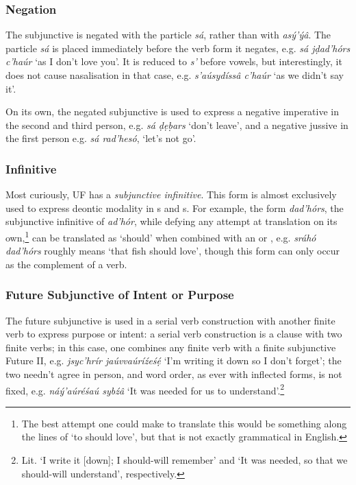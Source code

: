 \documentclass[a4paper, 12pt, twoside, final]{article}
\let \w \textit
\begin{document}
\subsubsection{Negation}\label{subsubsec:negated-subjunctive}
The subjunctive is negated with the particle \w{sá}, rather than with \w{asý’ýâ}. The particle \w{sá} is placed
immediately before the verb form it negates, e.g. \w{sá jḍad’hórs c’haúr} ‘as I don’t love you’. It is reduced
to \w{s’} before vowels, but interestingly, it does not cause nasalisation in that case, e.g. \w{s’aúsydíssâ c’haúr}
‘as we didn’t say it’.

On its own, the negated subjunctive is used to express a negative imperative in the second and third person,
e.g. \w{sá ḍẹḅars} ‘don’t leave’, and a negative jussive in the first person e.g. \w{sá rad’hesó}, ‘let’s not go’.

\subsubsection{Infinitive}
Most curiously, UF has a \textit{subjunctive infinitive}. This form is almost exclusively used to express deontic modality
in s and s. For example, the form \w{dad’hórs}, the subjunctive infinitive of \w{ad’hór}, while defying any attempt
at translation on its own,\footnote{The best attempt one could make to translate this would be something along the
lines of ‘to should love’, but that is not exactly grammatical in English.} can be translated as ‘should’ when combined
with an  or , e.g. \w{sráhó dad’hórs} roughly means ‘that fish should love’, though this form can only
occur as the complement of a verb.

\subsubsection{Future Subjunctive of Intent or Purpose}
The future subjunctive is used in a serial verb construction with another finite verb to express purpose or intent: a
serial verb construction is a clause with two finite verbs; in this case, one combines any finite verb with
a finite subjunctive Future II, e.g. \w{jsyc’hrír jaúvvaúríźeśẹ́} ‘I’m writing
it down so I don’t forget’; the two needn’t agree in person, and word order, as ever with inflected forms, is not fixed,
e.g. \w{náý’aúréśaú sybźâ} ‘It was needed
for us to understand’.\footnote{Lit. ‘I write it [down]; I should-will remember’ and ‘It was needed, so that we
should-will understand’, respectively.}
\end{document}
